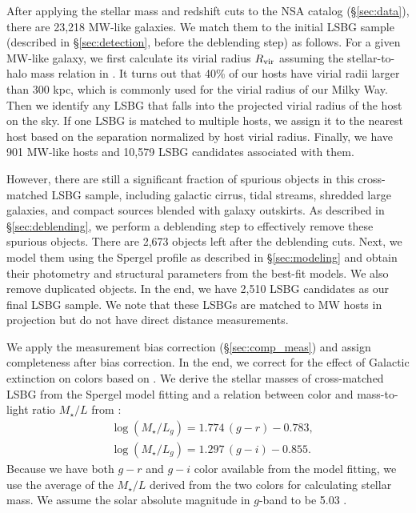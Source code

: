 \documentclass[twocolumn,astrosymb,twocolappendix]{aastex631}
\begin{document}
\begin{CJK*}{UTF8}{gbsn}
After applying the stellar mass and redshift cuts to the NSA catalog (\S\ref{sec:data}), there are 23,218 MW-like galaxies. We match them to the initial LSBG sample (described in \S \ref{sec:detection}, before the deblending step) as follows. For a given MW-like galaxy, we first calculate its virial radius $R_{\rm vir}$ assuming the stellar-to-halo mass relation in \citet{Behroozi2010}. It turns out that 40\% of our hosts have virial radii larger than 300 kpc, which is commonly used for the virial radius of our Milky Way. Then we identify any LSBG that falls into the projected virial radius of the host on the sky. If one LSBG is matched to multiple hosts, we assign it to the nearest host based on the separation normalized by host virial radius. Finally, we have 901 MW-like hosts and 10,579 LSBG candidates associated with them. 

However, there are still a significant fraction of spurious objects in this cross-matched LSBG sample, including galactic cirrus, tidal streams, shredded large galaxies, and compact sources blended with galaxy outskirts. As described in \S\ref{sec:deblending}, we perform a deblending step to effectively remove these spurious objects. There are 2,673 objects left after the deblending cuts. Next, we model them using the Spergel profile as described in \S\ref{sec:modeling} and obtain their photometry and structural parameters from the best-fit models. 
We also remove duplicated objects. In the end, we have 2,510 LSBG candidates as our final LSBG sample. We note that these LSBGs are matched to MW hosts in projection but do not have direct distance measurements. 

We apply the measurement bias correction (\S \ref{sec:comp_meas}) and assign completeness after bias correction. In the end, we correct for the effect of Galactic extinction on colors based on \citet{SFD1998,Schlafly2011}. We derive the stellar masses of cross-matched LSBG from the Spergel model fitting and a relation between color and mass-to-light ratio $M_{\star}/L$ from \citet{Into2013}:
\begin{align*}
&\log \left(M_{\star} / L_{g}\right)=1.774\,(g-r)-0.783, \\
&\log \left(M_{\star} / L_{g}\right)=1.297\,(g-i)-0.855.
\end{align*}
Because we have both $g-r$ and $g-i$ color available from the model fitting, we use the average of the $M_{\star}/L$ derived from the two colors for calculating stellar mass. We assume the solar absolute magnitude in $g$-band to be 5.03 \citep{Willmer2018}. 


\end{CJK*}
\end{document}
